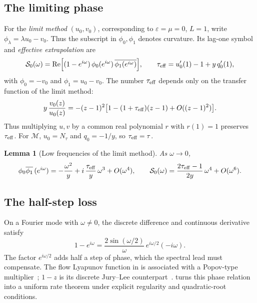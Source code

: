 \documentclass[11pt]{article}
\newtheorem{lemma}[theorem]{Lemma}
\theoremstyle{definition}
\theoremstyle{remark}
\newcommand{\cM}{\mathcal M}
\newcommand{\Rea}{\operatorname{Re}}
\newcommand{\teff}{\tau_{\rm eff}}
\begin{document}
\subsection{The limiting phase}
\label{sec:limitphase}

For the \emph{limit method} \((u_0,v_0)\), corresponding to
\(\varepsilon=\mu=0\), \(L=1\), write \(\phi_\lambda=\lambda u_0-v_0\).
Thus the subscript in \(\phi_0,\phi_1\) denotes curvature.
Its lag-one symbol and \emph{effective extrapolation} are
\[
\Szero(\omega)=\Rea\Bigl[(1-e^{i\omega})\,\phi_0(e^{i\omega})\,\overline{\phi_1(e^{i\omega})}\Bigr],\qquad
\teff=u_0'(1)-1+y\,q_0'(1),
\]
with \(\phi_0=-v_0\) and \(\phi_1=u_0-v_0\).  The number \(\teff\) depends only on the transfer function
of the limit method:
\[
y\,\frac{v_0(z)}{u_0(z)}=-(z-1)^2\bigl[1-(1+\teff)(z-1)+O((z-1)^2)\bigr].
\]
Thus multiplying \(u,v\) by a common real polynomial \(r\) with \(r(1)=1\)
preserves \(\teff\).
For \(\cM\), \(u_0=N_\tau\) and \(q_0=-1/y\), so \(\teff=\tau\).

\begin{lemma}[Low frequencies of the limit method]\label{lem:low}
As \(\omega\to0\),
\[
\phi_0\overline{\phi_1}\,(e^{i\omega})=-\frac{\omega^2}y+i\,\frac{\teff}y\,\omega^3+O(\omega^4),\qquad
\Szero(\omega)=\frac{2\teff-1}{2y}\,\omega^4+O(\omega^6).
\]
\end{lemma}

\subsection{The half-step loss}
\label{sec:halfstep-mechanism}

On a Fourier mode with \(\omega\ne0\), the discrete difference and continuous derivative satisfy
\begin{equation}\label{eq:halfstep-multiplier}
1-e^{i\omega}=\frac{2\sin(\omega/2)}{\omega}\,e^{i\omega/2}(-i\omega).
\end{equation}
The factor \(e^{i\omega/2}\) adds half a step of phase, which the spectral
lead must compensate.  The flow Lyapunov function in  is
associated with a Popov-type multiplier~\cite{Pop62};
\(1-z\) is its discrete Jury--Lee counterpart~\cite{JL64}.
 turns this phase relation into a uniform rate theorem
under explicit regularity and quadratic-root conditions.
\end{document}
